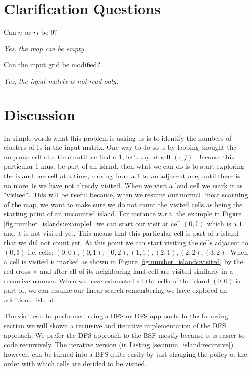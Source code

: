\section{Clarification Questions}

\begin{QandA}
	\item Can $n$ or $m$ be $0$?
	\begin{answered}
		\textit{Yes, the map can be empty}
	\end{answered}
	\item Can the input grid be modified?
	\begin{answered}
		\textit{Yes, the input matrix is not read-only.}
	\end{answered}
\end{QandA}

\section{Discussion}
\label{number_islands:sec:discussion}
In simple words what this problem is asking us is  to identify the numbers of  clusters of $1$s in the input matrix.
One way to do so is by looping thought the map one cell at a time until we find a $1$, let's say at cell $(i,j)$.
Because this particular $1$ must be part of an island, then what we can do is to start exploring the island
one cell at a time, moving from a $1$ to an adjacent one, until there is no more $1$s we have not already visited.
When we visit a land cell we mark it as "visited".
This will be useful because, when we resume our normal linear scanning of the map, we want to make
sure we do not count the visited cells as being the starting point of an uncounted island.
For instance w.r.t. the example in Figure \ref{fig:number_islands:example1} we can start our visit
at cell $(0,0)$ which is a $1$ and it is not visited yet. This means that this particular cell is
part of a island that we did not count yet. At this point we can start visiting the cells adjacent
to $(0,0)$ i.e. cells: $(0,0), (0,1), (0,2), (1,1), (2,1), (2,2), (3,2)$. When a cell is visited is
marked as shown in Figure  \ref{fig:number_islands:visited} by the red cross
\textcolor[HTML]{860000}{$\times$} and after all of its neighboring land cell are visited similarly in a recursive manner.
When we have exhausted all the cells of the island $(0,0)$ is part of, we can resume our linear search remembering we have explored an additional island.

The visit can be performed using a BFS or DFS approach. In the following section we will shown a
recursive and iterative implementation of the DFS approach. We prefer the DFS approach to the BSF mostly because it is easier to 
code recursively.
The iterative version (in Listing \ref{sec:num_island:recursive}) however, can be turned
into a BFS quite easily by just changing the policy of the order with which cells are decided to be visited.


